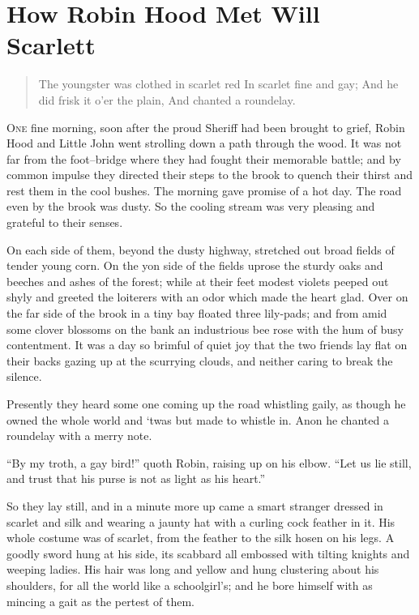 \chapter{How Robin Hood Met Will Scarlett}

\begin{quote}
The youngster was clothed in scarlet red
In scarlet fine and gay;
And he did frisk it o’er the plain,
And chanted a roundelay.
\end{quote}

\lettrine{O}{ne} fine morning, soon after the proud Sheriff had been brought to
grief, Robin Hood and Little John went strolling down a path through the
wood. It was not far from the foot--bridge where they had fought their
memorable battle; and by common impulse they directed their steps to the
brook to quench their thirst and rest them in the cool bushes. The
morning gave promise of a hot day. The road even by the brook was dusty.
So the cooling stream was very pleasing and grateful to their senses.

On each side of them, beyond the dusty highway, stretched out broad
fields of tender young corn. On the yon side of the fields uprose the
sturdy oaks and beeches and ashes of the forest; while at their feet
modest violets peeped out shyly and greeted the loiterers with an odor
which made the heart glad. Over on the far side of the brook in a tiny
bay floated three lily-pads; and from amid some clover blossoms on the
bank an industrious bee rose with the hum of busy contentment. It was a
day so brimful of quiet joy that the two friends lay flat on their backs
gazing up at the scurrying clouds, and neither caring to break the
silence.

Presently they heard some one coming up the road whistling gaily, as
though he owned the whole world and `twas but made to whistle in. Anon
he chanted a roundelay with a merry note.

``By my troth, a gay bird!'' quoth Robin, raising up on his elbow. ``Let
us lie still, and trust that his purse is not as light as his heart.''

So they lay still, and in a minute more up came a smart stranger dressed
in scarlet and silk and wearing a jaunty hat with a curling cock feather
in it. His whole costume was of scarlet, from the feather to the silk
hosen on his legs. A goodly sword hung at his side, its scabbard all
embossed with tilting knights and weeping ladies. His hair was long and
yellow and hung clustering about his shoulders, for all the world like a
schoolgirl's; and he bore himself with as mincing a gait as the pertest
of them.

